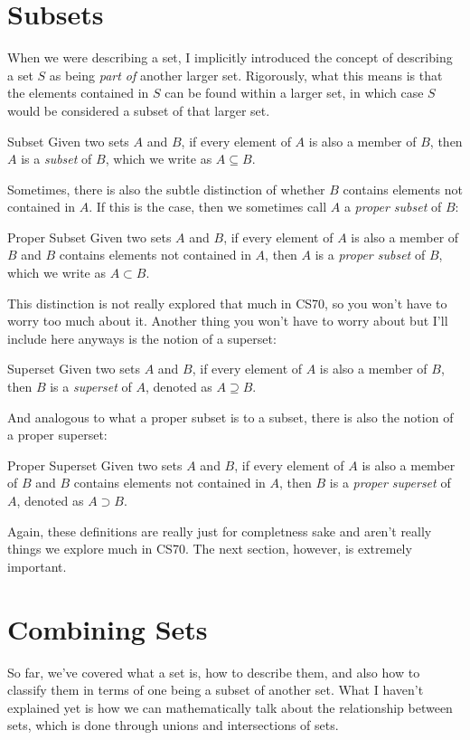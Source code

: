 \section{Subsets}
When we were describing a set, I implicitly introduced the concept of describing a set \( S \) as being 
\textit{part of} another larger set. Rigorously, what this means is that the elements contained in \( S \) 
can be found within a larger set, in which case \( S \) would be considered a subset of that larger set. 
\begin{definition}{Subset}{}
	Given two sets \( A \) and \( B \), if every element of \( A \) is also a member of \( B \), then 
	\( A \) is a \textit{subset} of \( B \), which we write as 
	\( A \subseteq B \). 
\end{definition}
Sometimes, there is also the subtle distinction of whether \( B \) contains elements not contained in \( A \). If 
this is the case, then we sometimes call \( A \) a \textit{proper subset} of \( B \):
\begin{definition}{Proper Subset}{}
	Given two sets \( A \) and \( B \), if every element of \( A \) is also a member of \( B \) and \( B \) 
	contains elements not contained in \( A \), then \( A \) is a \textit{proper subset} of \( B \), 
	which we write as \( A \subset  B \). 
\end{definition}
This distinction is not really explored that much in CS70, so you won't have to worry too much about it. Another 
thing you won't have to worry about but I'll include here anyways is the notion of a superset: 
\begin{definition}{Superset}{}
	Given two sets \( A \) and \( B \), if every element of \( A \) is also a member of \( B \), then 
	\( B \) is a \textit{superset} of \( A \), denoted as \( A \supseteq B \). 
\end{definition}
And analogous to what a proper subset is to a subset, there is also the notion of a proper superset:
\begin{definition}{Proper Superset}{}
	Given two sets \( A \) and \( B \), if every element of \( A \) is also a member of \( B \) and \( B \) 
	contains elements not contained in \( A \), then 
	\( B \) is a \textit{proper superset} of \( A \), denoted as \( A \supset B \). 
\end{definition}
Again, these definitions are really just for completness sake and aren't really things we explore 
much in CS70. The next section, however, is extremely important.
\section{Combining Sets}
So far, we've covered what a set is, how to describe them, and also how to classify them in terms of one 
being a subset of another set. What I haven't explained yet is how we can mathematically talk about the relationship
between sets, which is done through unions and intersections of sets. 

